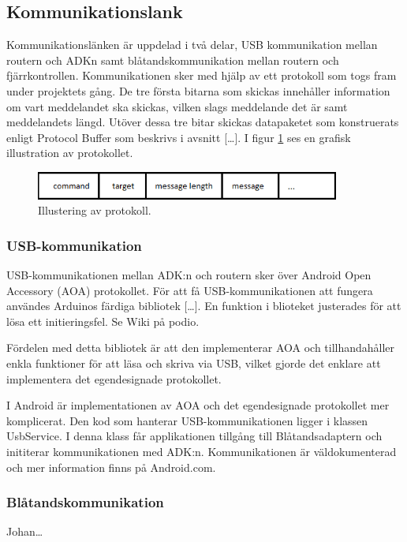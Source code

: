 \subsection{Kommunikationslank}
Kommunikationslänken är uppdelad i två delar, USB kommunikation mellan routern och ADKn 
samt blåtandskommunikation mellan routern och fjärrkontrollen. Kommunikationen sker med hjälp av ett protokoll som 
togs fram under projektets gång. De tre första bitarna som skickas innehåller information om vart meddelandet ska skickas, 
vilken slags meddelande det är samt meddelandets längd. Utöver dessa tre bitar skickas datapaketet som konstruerats enligt 
Protocol Buffer som beskrivs i avsnitt [\ldots]. I figur \ref{fig:protocol} ses en grafisk illustration av protokollet.

\begin{figure}[htbp!]
\centering
\includegraphics[width=10cm]{../../includes/figures/protocol.png}
\caption{Illustering av protokoll.}
\label{fig:protocol}
\end{figure}


\subsubsection{USB-kommunikation}
USB-kommunikationen mellan ADK:n och routern sker över Android Open Accessory (AOA) protokollet. 
För att få USB-kommunikationen att fungera användes Arduinos färdiga bibliotek [\ldots]. En funktion i blioteket justerades för 
att lösa ett initieringsfel. Se Wiki på podio.
 
Fördelen med detta bibliotek är att den implementerar AOA och tillhandahåller enkla funktioner för att läsa och skriva via USB, vilket 
gjorde det enklare att implementera det egendesignade protokollet.

I Android är implementationen av AOA och det egendesignade protokollet mer komplicerat. Den kod som hanterar USB-kommunikationen ligger 
i klassen UsbService. I denna klass får applikationen tillgång till Blåtandsadaptern och inititerar kommunikationen med ADK:n. 
Kommunikationen är väldokumenterad och mer information finns på Android.com.
 
\subsubsection{Blåtandskommunikation}
Johan\ldots
